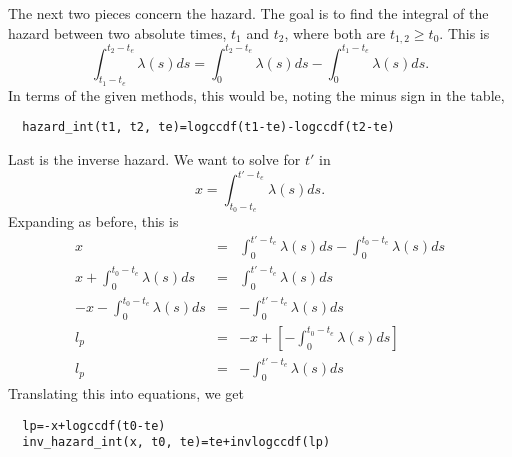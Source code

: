 \documentclass{article}
\begin{document}
The next two pieces concern the hazard. The goal is to find the integral
of the hazard between two absolute times, $t_1$ and $t_2$, where both
are $t_{1,2}\ge t_0$. This is
\begin{equation}
  \int_{t_1-t_e}^{t_2-t_e} \lambda(s)ds=\int_{0}^{t_2-t_e} \lambda(s)ds
  	-\int_{0}^{t_1-t_e} \lambda(s)ds.
\end{equation}
In terms of the given methods, this would be, noting the minus sign
in the table,
\begin{lstlisting}
  hazard_int(t1, t2, te)=logccdf(t1-te)-logccdf(t2-te)
\end{lstlisting}

Last is the inverse hazard. We want to solve for $t'$ in
\begin{equation}
  x=\int_{t_0-t_e}^{t'-t_e}\lambda(s)ds.
\end{equation}
Expanding as before, this is
\begin{eqnarray}
  x&=&\int_{0}^{t'-t_e}\lambda(s)ds-\int_{0}^{t_0-t_e}\lambda(s)ds \\
  x+\int_{0}^{t_0-t_e}\lambda(s)ds&=&\int_{0}^{t'-t_e}\lambda(s)ds \\
  -x-\int_{0}^{t_0-t_e}\lambda(s)ds&=& -\int_{0}^{t'-t_e}\lambda(s)ds \\
  l_p&=&-x+\left[-\int_{0}^{t_0-t_e}\lambda(s)ds\right] \\
  l_p&=&-\int_{0}^{t'-t_e}\lambda(s)ds
\end{eqnarray}
Translating this into equations, we get
\begin{lstlisting}
  lp=-x+logccdf(t0-te)
  inv_hazard_int(x, t0, te)=te+invlogccdf(lp)
\end{lstlisting}
\end{document}
